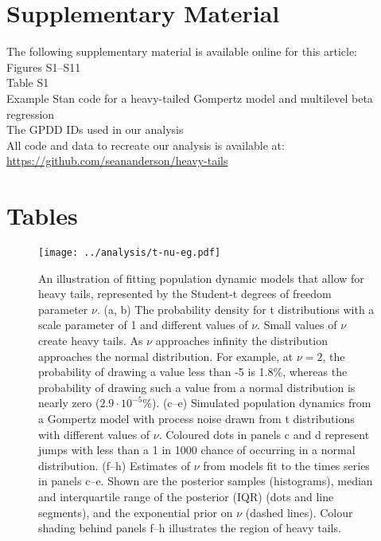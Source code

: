 \section{Supplementary Material}

The following supplementary material is available online for this article:\\
Figures S1--S11\\
Table S1\\
Example Stan code for a heavy-tailed Gompertz model and multilevel beta
regression\\
The GPDD IDs used in our analysis\\
All code and data to recreate our analysis is available at:\\
\url{https://github.com/seananderson/heavy-tails}





\clearpage

\section{Tables}



\begin{figure}[htbp]
\begin{center}
\texttt{[image: ../analysis/t-nu-eg.pdf]}
\caption{
An illustration of fitting population dynamic models that allow for heavy
tails, represented by the Student-t degrees of freedom parameter $\nu$. (a, b)
The probability density for t distributions with a scale parameter of 1 and
different values of $\nu$. Small values of $\nu$ create heavy tails. As $\nu$
approaches infinity the distribution approaches the normal distribution. For
example, at $\nu = 2$, the probability of drawing a value less than -5 is
1.8\%, whereas the probability of drawing such a value from a normal
distribution is nearly zero ($2.9\cdot10^{-5}$\%). (c--e) Simulated population
dynamics from a Gompertz model with process noise drawn from t distributions
with different values of $\nu$. Coloured dots in panels c and d represent jumps
with less than a 1 in 1000 chance of occurring in a normal distribution. (f--h)
Estimates of $\nu$ from models fit to the times series in panels c--e. Shown
are the posterior samples (histograms), median and interquartile range of the
posterior (IQR) (dots and line segments), and the exponential prior on $\nu$
(dashed lines). Colour shading behind panels f--h illustrates the region of
heavy tails.}
\label{fig:didactic}
\end{center}
\end{figure}

